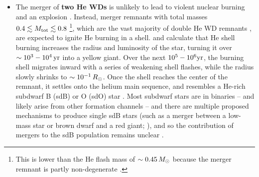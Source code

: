 \begin{itemize}
	\item The merger of {\bf two He WDs} is unlikely to lead to violent nuclear burning and an explosion \citep{dan+12,dan+14,dan+15}.  Instead, merger remnants with total masses $0.4\lesssim \Mtot \lesssim 0.8$ \citep{han+02,ibent85}\footnote{This is lower than the He flash mass of $\sim0.45\,\Msun$ because the merger remnant is partly non-degenerate \citep{ibent85, han+02}.}, which are the vast majority of double He WD remnants \citep{nele10}, are expected to ignite He burning in a shell.  \citep{saioj00} and \cite{zhanj12} calculate that He shell burning increases the radius and luminosity of the star, turning it over $\sim 10^3-10^4\,\mathrm{yr}$ into a yellow giant.  Over the next $10^5-10^6\mathrm{yr}$, the burning shell migrates inward with a series of weakening shell flashes, while the radius slowly shrinks to $\sim10^{-1}\,\Rsun$.  Once the shell reaches the center of the remnant, it settles onto the helium main sequence, and resembles a He-rich subdwarf B (sdB) or O (sdO) star \citep{saioj00, justph11, zhanj12, hebe16}.  Most subdwarf stars are in binaries -- and likely arise from other formation channels -- and there are multiple proposed mechanisms to produce single sdB stars (such as a merger between a low-mass star or brown dwarf and a red giant; \citealt{soke98}), and so the contribution of mergers to the sdB population remains unclear \citep{nele10, hebe16}.





\end{itemize}

